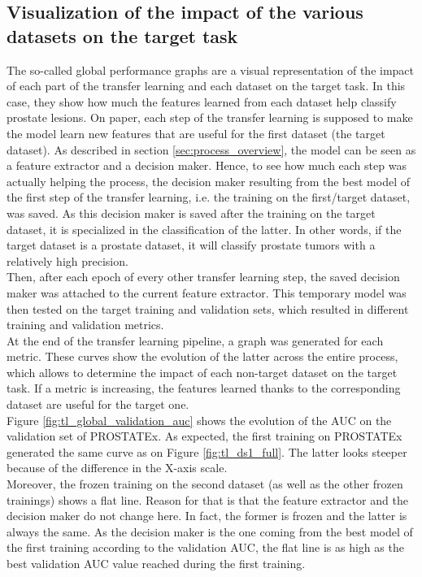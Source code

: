 \subsection{Visualization of the impact of the various datasets on the target task}
\setlength{\marginparwidth}{3cm}\leavevmode {}The so-called global performance graphs are a visual representation of the impact of each part of the transfer learning and each dataset on the target task. In this case, they show how much the features learned from each dataset help classify prostate lesions. On paper, each step of the transfer learning is supposed to make the model learn new features that are useful for the first dataset (the target dataset). As described in section \ref{sec:process_overview}, the model can be seen as a feature extractor and a decision maker. Hence, to see how much each step was actually helping the process, the decision maker resulting from the best model of the first step of the transfer learning, i.e. the training on the first/target dataset, was saved. As this decision maker is saved after the training on the target dataset, it is specialized in the classification of the latter. In other words, if the target dataset is a prostate dataset, it will classify prostate tumors with a relatively high precision.\\
Then, after each epoch of every other transfer learning step, the saved decision maker was attached to the current feature extractor. This temporary model was then tested on the target training and validation sets, which resulted in different training and validation metrics.\\
At the end of the transfer learning pipeline, a graph was generated for each metric. These curves show the evolution of the latter across the entire process, which allows to determine the impact of each non-target dataset on the target task. If a metric is increasing, the features learned thanks to the corresponding dataset are useful for the target one.\\
Figure \ref{fig:tl_global_validation_auc} shows the evolution of the AUC on the validation set of PROSTATEx. As expected, the first training on PROSTATEx generated the same curve as on Figure \ref{fig:tl_ds1_full}. The latter looks steeper because of the difference in the X-axis scale.\\
Moreover, the frozen training on the second dataset (as well as the other frozen trainings) shows a flat line. Reason for that is that the feature extractor and the decision maker do not change here. In fact, the former is frozen and the latter is always the same. As the decision maker is the one coming from the best model of the first training according to the validation AUC, the flat line is as high as the best validation AUC value reached during the first training.\\
